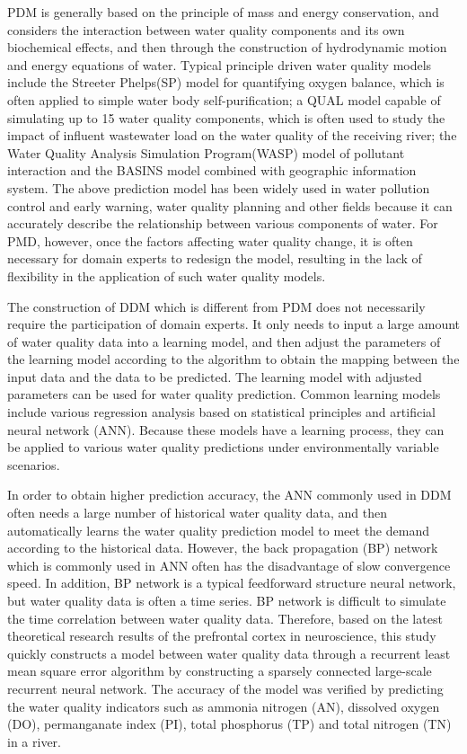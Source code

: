 \documentclass[runningheads]{llncs}
\begin{document}
PDM is generally based on the principle of mass and energy conservation, 
and considers the interaction between water quality components and its
own biochemical effects, and then through the construction of hydrodynamic 
motion and energy equations of water\cite{RN5,RN6}. Typical principle driven water 
quality models include the Streeter Phelps(SP) model for quantifying oxygen 
balance\cite{RN7}, which is often applied to simple water body self-purification; 
a QUAL model capable of simulating up to 15 water quality components\cite{RN5}, 
which is often used to study the impact of influent wastewater load on the water 
quality of the receiving river; the Water Quality Analysis Simulation Program(WASP) 
model of pollutant interaction\cite{RN6} and the BASINS model combined with geographic 
information system\cite{RN5,RN8}. The above prediction model has been widely used 
in water pollution control and early warning, water quality planning and 
other fields because it can accurately describe the relationship between 
various components of water. For PMD, however, once the factors affecting 
water quality change, it is often necessary for domain experts to redesign 
the model, resulting in the lack of flexibility in the application of 
such water quality models.

The construction of DDM which is different from PDM does not necessarily 
require the participation of domain experts. It only needs to input 
a large amount of water quality data into a learning model, and then 
adjust the parameters of the learning model according to the algorithm 
to obtain the mapping between the input data and the data to 
be predicted. The learning model with adjusted parameters can be 
used for water quality prediction. Common learning models include various 
regression analysis based on statistical principles\cite{RN9,RN10,RN11,RN12} and artificial
neural network (ANN)\cite{RN13,RN14,RN15,RN16,RN17,RN18}. Because these models have a 
learning process, they can be applied to various water quality 
predictions under environmentally variable scenarios.

In order to obtain higher prediction accuracy, the ANN 
commonly used in DDM often needs a large number of historical 
water quality data, and then automatically learns the water 
quality prediction model to meet the demand according 
to the historical data. However, the back propagation (BP) 
network which is commonly used in ANN often has the 
disadvantage of slow convergence speed. In addition, BP network is 
a typical feedforward structure neural network, but water quality data 
is often a time series\cite{RN19}. BP network is difficult to simulate the time 
correlation between water quality data. Therefore, based on the latest theoretical 
research results of the prefrontal cortex in neuroscience\cite{RN20,RN21}, this 
study quickly constructs a model between water quality data through a 
recurrent least mean square error algorithm by constructing a 
sparsely connected large-scale recurrent neural network. 
The accuracy of the model was verified by predicting the water quality 
indicators such as ammonia nitrogen (AN), dissolved oxygen (DO), permanganate index (PI), 
total phosphorus (TP) and total nitrogen (TN) in a river.
\end{document}
